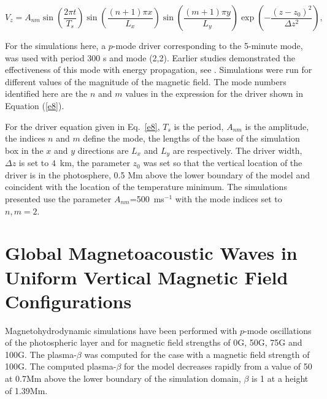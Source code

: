 \documentclass[physics,article,submit,pdftex,moreauthors]{Definitions/mdpi}
\begin{document}
\begin{equation}
 V_{z}  =  A_{nm} \sin\left(\frac{2\pi t}{T_s} \right)\sin\left(  \frac{(n+1)\pi x}{L_x} \right)  
 \sin\left(\frac{(m+1)\pi y}{L_y} \right) \exp\left( -\frac{(z-z_0)^2}{\Delta z^2} \right),
\label{e8}
\end{equation}

For the  simulations here, a $p$-mode driver corresponding to the 5-minute mode, was used with period 300 s and mode (2,2). Earlier studies demonstrated the effectiveness of this mode with energy propagation, see \cite{Griffiths2018b}. Simulations were run for different values of the magnitude of the magnetic field. The mode numbers identified here are the $n$ and $m$ values in the expression for the driver shown in Equation (\ref{e8}).











For the driver equation given in Eq.~\ref{e8}, $T_{s}$ is the period, $A_{nm}$ is the amplitude, the indices $n$ and $m$ define the mode, the lengths of the base of the simulation box in the $x$ and $y$ directions are $L_{x}$ and $L_{y}$ are  respectively. The driver width, $\Delta z$ is set to $4$~km, the parameter $z_{0}$ was set so that the vertical location of the driver is in the photosphere, 0.5 Mm above the lower boundary of the model and coincident with the location of the temperature minimum. The simulations presented use the parameter $A_{nm}$=500\, ms$^{-1}$ with the mode indices set to $n,m=2$. 


\section{Global Magnetoacoustic Waves in Uniform Vertical Magnetic Field Configurations}

Magnetohydrodynamic simulations have been performed with $p$-mode oscillations of the photospheric layer and for magnetic field strengths of 0G, 50G, 75G and 100G. The plasma-$\beta$ was computed for the case with a magnetic field strength of 100G. The computed plasma-$\beta$ for the model decreases rapidly from a value of 50 at 0.7Mm above the lower boundary of the simulation domain, $\beta$ is 1 at a height of 1.39Mm.  
\end{document}

